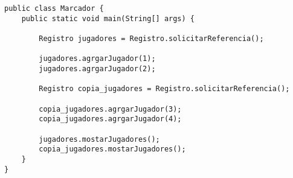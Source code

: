 \documentclass[12pt]{book}
\begin{document}
\begin{verbatim}
public class Marcador {
    public static void main(String[] args) {
    
        Registro jugadores = Registro.solicitarReferencia();
    
        jugadores.agrgarJugador(1);
        jugadores.agrgarJugador(2);
    
        Registro copia_jugadores = Registro.solicitarReferencia();
    
        copia_jugadores.agrgarJugador(3);
        copia_jugadores.agrgarJugador(4);
        
        jugadores.mostarJugadores();
        copia_jugadores.mostarJugadores();	
    }
}
\end{verbatim}
 
\end{document}
